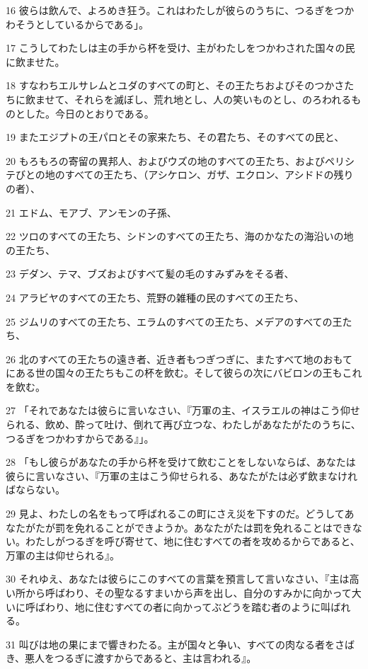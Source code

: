 \par 16 彼らは飲んで、よろめき狂う。これはわたしが彼らのうちに、つるぎをつかわそうとしているからである」。
\par 17 こうしてわたしは主の手から杯を受け、主がわたしをつかわされた国々の民に飲ませた。
\par 18 すなわちエルサレムとユダのすべての町と、その王たちおよびそのつかさたちに飲ませて、それらを滅ぼし、荒れ地とし、人の笑いものとし、のろわれるものとした。今日のとおりである。
\par 19 またエジプトの王パロとその家来たち、その君たち、そのすべての民と、
\par 20 もろもろの寄留の異邦人、およびウズの地のすべての王たち、およびペリシテびとの地のすべての王たち、（アシケロン、ガザ、エクロン、アシドドの残りの者）、
\par 21 エドム、モアブ、アンモンの子孫、
\par 22 ツロのすべての王たち、シドンのすべての王たち、海のかなたの海沿いの地の王たち、
\par 23 デダン、テマ、ブズおよびすべて髪の毛のすみずみをそる者、
\par 24 アラビヤのすべての王たち、荒野の雑種の民のすべての王たち、
\par 25 ジムリのすべての王たち、エラムのすべての王たち、メデアのすべての王たち、
\par 26 北のすべての王たちの遠き者、近き者もつぎつぎに、またすべて地のおもてにある世の国々の王たちもこの杯を飲む。そして彼らの次にバビロンの王もこれを飲む。
\par 27 「それであなたは彼らに言いなさい、『万軍の主、イスラエルの神はこう仰せられる、飲め、酔って吐け、倒れて再び立つな、わたしがあなたがたのうちに、つるぎをつかわすからである』」。
\par 28 「もし彼らがあなたの手から杯を受けて飲むことをしないならば、あなたは彼らに言いなさい、『万軍の主はこう仰せられる、あなたがたは必ず飲まなければならない。
\par 29 見よ、わたしの名をもって呼ばれるこの町にさえ災を下すのだ。どうしてあなたがたが罰を免れることができようか。あなたがたは罰を免れることはできない。わたしがつるぎを呼び寄せて、地に住むすべての者を攻めるからであると、万軍の主は仰せられる』。
\par 30 それゆえ、あなたは彼らにこのすべての言葉を預言して言いなさい、『主は高い所から呼ばわり、その聖なるすまいから声を出し、自分のすみかに向かって大いに呼ばわり、地に住むすべての者に向かってぶどうを踏む者のように叫ばれる。
\par 31 叫びは地の果にまで響きわたる。主が国々と争い、すべての肉なる者をさばき、悪人をつるぎに渡すからであると、主は言われる』。

